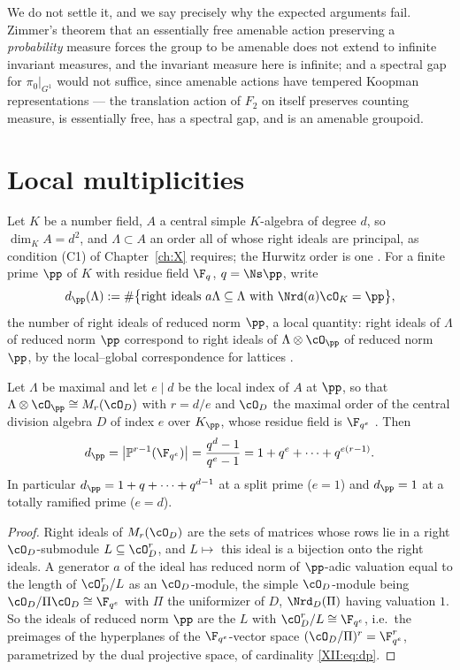 \begin{summary}
We do not settle it, and we say precisely why the expected arguments fail. Zimmer's theorem
that an essentially free amenable action preserving a \emph{probability} measure forces the
group to be amenable does not extend to infinite invariant measures, and the invariant
measure here is infinite; and a spectral gap for $\pi_0|_{G^1}$ would not suffice, since
amenable actions have tempered Koopman representations --- the translation action of $F_2$
on itself preserves counting measure, is essentially free, has a spectral gap, and is an
amenable groupoid.
\end{summary}


\section{Local multiplicities}

Let $K$ be a number field, $A$ a central simple $K$-algebra of degree $d$, so
$\dim_KA=d^2$, and $\Lambda\subset A$ an order all of whose right ideals are principal, as
condition (C1) of Chapter~\ref{ch:X} requires; the Hurwitz order is one \cite{Reiner,Vigneras}. For a
finite prime $\pp$ of $K$ with residue field $\F_q$, $q=\Ns\pp$, write
\[
d_\pp(\Lambda):=\#\bigl\{\text{right ideals }a\Lambda\subseteq\Lambda\text{ with }\Nrd(a)\cO_K=\pp\bigr\},
\]
the number of right ideals of reduced norm $\pp$, a local quantity: right ideals of
$\Lambda$ of reduced norm $\pp$ correspond to right ideals of $\Lambda\otimes\cO_\pp$ of
reduced norm $\pp$, by the local--global correspondence for lattices \cite{Reiner}.

\begin{lemma}\label{XII:lem:split}
Let $\Lambda$ be maximal and let $e\mid d$ be the local index of $A$ at $\pp$, so that
$\Lambda\otimes\cO_\pp\cong M_{r}(\cO_D)$ with $r=d/e$ and $\cO_D$ the maximal order of the
central division algebra $D$ of index $e$ over $K_\pp$, whose residue field is $\F_{q^e}$
\cite[Ch.~3]{Reiner}. Then
\begin{equation}\label{XII:eq:dp}
d_\pp=\bigl|\mathbb P^{r-1}(\F_{q^e})\bigr|=\frac{q^{d}-1}{q^{e}-1}=1+q^e+\cdots+q^{e(r-1)} .
\end{equation}
In particular $d_\pp=1+q+\cdots+q^{d-1}$ at a split prime ($e=1$) and $d_\pp=1$ at a totally
ramified prime ($e=d$).
\end{lemma}

\begin{proof}
Right ideals of $M_r(\cO_D)$ are the sets of matrices whose rows lie in a right
$\cO_D$-submodule $L\subseteq\cO_D^r$, and $L\mapsto$ this ideal is a bijection onto the
right ideals. A generator $a$ of the ideal has reduced norm of $\pp$-adic valuation equal
to the length of $\cO_D^r/L$ as an $\cO_D$-module, the simple $\cO_D$-module being
$\cO_D/\Pi\cO_D\cong\F_{q^e}$ with $\Pi$ the uniformizer of $D$, $\Nrd_D(\Pi)$ having
valuation $1$. So the ideals of reduced norm $\pp$ are the $L$ with $\cO_D^r/L\cong\F_{q^e}$,
i.e.\ the preimages of the hyperplanes of the $\F_{q^e}$-vector space
$(\cO_D/\Pi)^r=\F_{q^e}^r$, parametrized by the dual projective space, of cardinality
\eqref{XII:eq:dp}.
\end{proof}

